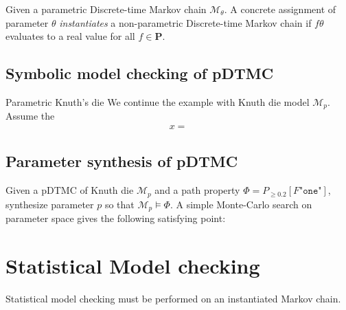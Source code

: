 Given a parametric Discrete-time Markov chain $\mathcal{M}_\theta$. A concrete assignment of parameter $\theta$
\textit{instantiates} a non-parametric Discrete-time Markov chain if $f{\theta}$ evaluates to a
real value for all $f\in\mathbf{P}$.

\subsection{Symbolic model checking of pDTMC}

\begin{example}{Parametric Knuth's die}
    We continue the example with Knuth die model $\mathcal{M}_{p}$. Assume the
    \begin{align*}
        x =
    \end{align*}
\end{example}

\subsection{Parameter synthesis of pDTMC}

\begin{example}
    Given a pDTMC of Knuth die $\mathcal{M}_{p}$ and a path property $\Phi = P_{\geq 0.2} [F
                \texttt{"one"}]$, synthesize parameter $p$ so that $\mathcal{M}_{p} \models \Phi$. A simple
    Monte-Carlo search on parameter space gives the following satisfying point:
\end{example}
\section{Statistical Model checking}
Statistical model checking must be performed on an instantiated Markov chain.

